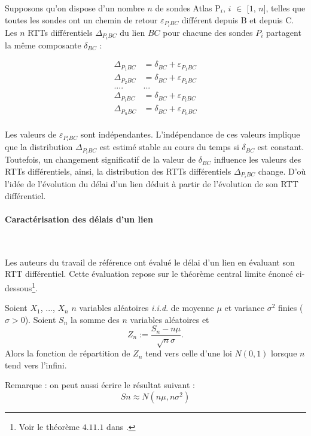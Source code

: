 Supposons qu'on dispose d'un nombre $n$ de sondes Atlas P$_i$, $i$ $\in$ [$1$, $n$], telles que toutes les sondes ont un chemin de retour  $\varepsilon_{P_{i}BC}$ différent depuis B et depuis C.  Les $n$ RTTs différentiels $\Delta_{P{_i}BC}$ du lien $BC$ pour chacune des sondes $P_i$  partagent la même composante $\delta_{BC}$ :


\begin{align*}
\Delta_{P_{1}BC} &= \delta_{BC} + \varepsilon_{P_{1}BC}\\
\Delta_{P_{2}BC} &= \delta_{BC} + \varepsilon_{P_{2}BC}\\
.... &   ... \\
\Delta_{P_{i}BC} &= \delta_{BC} + \varepsilon_{P_{i}BC}\\
\Delta_{P_{n}BC} &= \delta_{BC} + \varepsilon_{P_{n}BC}\\
\end{align*}

Les valeurs de  $\varepsilon_{P_{i}BC}$ sont  indépendantes. L'indépendance de ces valeurs implique que la distribution $\Delta_{P_{i}BC}$ est estimé  stable au cours du temps si $\delta_{BC}$ est constant. Toutefois, un changement significatif de la valeur de $\delta_{BC}$ influence les valeurs des RTTs différentiels, ainsi,  la distribution des RTTs différentiels $\Delta_{P_{i}BC}$ change. D'où l'idée de l'évolution du délai d'un lien déduit  à partir de l'évolution de son RTT différentiel.

\paragraph{Caractérisation des délais d'un lien}~

Les auteurs du travail de référence \cite{DBLP:journals/corr/FontugneAPB16} ont évalué le délai d'un lien en évaluant son RTT différentiel. Cette évaluation repose sur le théorème central limite énoncé ci-dessous\footnote{Voir le théorème  $ 4.11.1 $ dans \cite{lefebvre2003cours}.}.

\begin{tcolorbox}
	Soient $X_1$, ..., $X_n$ $n$ variables aléatoires \textit{i.i.d}. de moyenne $\mu$ et variance $\sigma^2$ finies ($\sigma > 0$). Soient $S_n$ la somme des $n$ variables aléatoires et 
	\begin{equation}
	Z_n := \frac{S_n - n\mu}{\sqrt{n} \sigma}.
	\end{equation} 
	Alors la fonction de répartition de $Z_n$ tend vers celle d'une loi $N(0,1)$ lorsque $n$ tend vers l'infini.
	
	Remarque : on peut aussi écrire le résultat suivant :
	\begin{equation}
	Sn \approx N(n\mu, n\sigma^2)
	\end{equation}
\end{tcolorbox}

